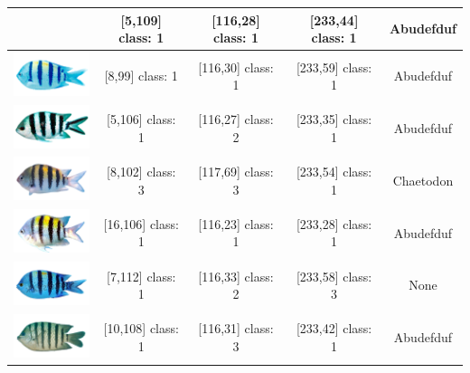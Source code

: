\begin{longtable}{|c|c|c|c|c|}
	& [5,109] class: 1 & [116,28] class: 1 & [233,44] class: 1 & Abudefduf \\
	\hline
	\includegraphics[width=3cm]{gambar/dataset_validasi/Abudefduf19}
	& [8,99] class: 1 & [116,30] class: 1 & [233,59] class: 1 & Abudefduf \\
	\hline
	\includegraphics[width=3cm]{gambar/dataset_validasi/Abudefduf20}
	& [5,106] class: 1 & [116,27] class: 2 & [233,35] class: 1 & Abudefduf \\
	\hline
	\includegraphics[width=3cm]{gambar/dataset_validasi/Abudefduf21}
	& [8,102] class: 3 & [117,69] class: 3 & [233,54] class: 1 & Chaetodon \\
	\hline
	\includegraphics[width=3cm]{gambar/dataset_validasi/Abudefduf22}
	& [16,106] class: 1 & [116,23] class: 1 & [233,28] class: 1 & Abudefduf \\
	\hline
	\includegraphics[width=3cm]{gambar/dataset_validasi/Abudefduf23}
	& [7,112] class: 1 & [116,33] class: 2 & [233,58] class: 3 & None \\
	\hline
	\includegraphics[width=3cm]{gambar/dataset_validasi/Abudefduf24}
	& [10,108] class: 1 & [116,31] class: 3 & [233,42] class: 1 & Abudefduf \\

\end{longtable}
